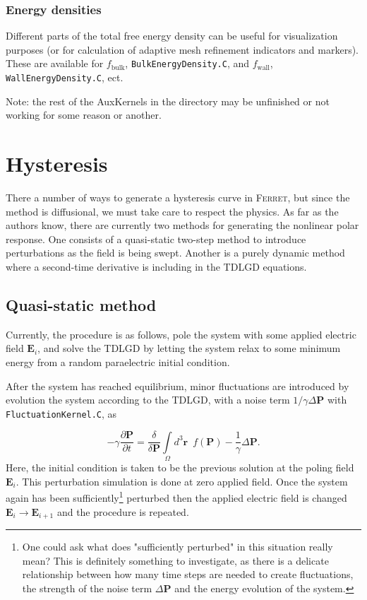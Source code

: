 \documentclass[16pt]{article} %
\begin{document}
%
\subsubsection{Energy densities}

Different parts of the total free energy density can be useful for visualization purposes (or for calculation of adaptive mesh refinement indicators and markers). These are available for $f_\mathrm{bulk}$, \texttt{BulkEnergyDensity.C}, and $f_\mathrm{wall}$, \texttt{WallEnergyDensity.C}, ect.

Note: the rest of the AuxKernels in the directory may be unfinished or not working for some reason or another.


\section{Hysteresis}

There a number of ways to generate a hysteresis curve in \textsc{Ferret}, but since the method is diffusional, we must take care to respect the physics. As far as the authors know, there are currently two methods for generating the nonlinear polar response. One consists of a quasi-static two-step method to introduce perturbations as the field is being swept. Another is a purely dynamic method where a second-time derivative is including in the TDLGD equations.

\subsection{Quasi-static method}

 Currently, the procedure is as follows, pole the system with some applied electric field $\textbf{E}_i$, and solve the TDLGD by letting the system relax to some minimum energy from a random paraelectric initial condition. 

After the system has reached equilibrium, minor fluctuations are introduced by evolution the system according to the TDLGD, with a noise term $1/\gamma \Delta \textbf{P}$ with \texttt{FluctuationKernel.C}, as

\begin{equation}\tag{40}
- \gamma \frac{\partial \textbf{P}}{\partial t} =  \frac{\delta}{\delta \textbf{P}}\int\limits_\Omega d^3 \textbf{r} \,\,\,f\left(\textbf{P} \right)  - \frac{1}{\gamma} \Delta \textbf{P}.
\end{equation}
%
Here, the initial condition is taken to be the previous solution at the poling field $\textbf{E}_i$. This perturbation simulation is done at zero applied field. 
%
Once the system again has been sufficiently\footnote{One could ask what does "sufficiently perturbed" in this situation really mean? This is definitely something to investigate, as there is a delicate relationship between how many time steps are needed to create fluctuations, the strength of the noise term $\Delta \textbf{P}$ and the energy evolution of the system.} perturbed then the applied electric field is changed $\textbf{E}_{i} \to \textbf{E}_{i+1}$ and the procedure is repeated.
%
\end{document}
